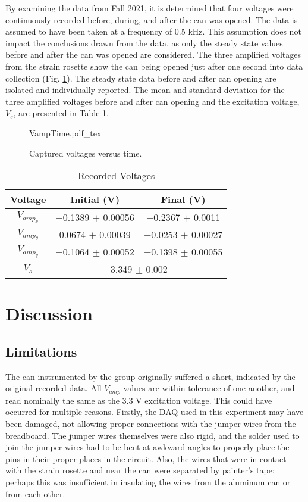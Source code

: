 \documentclass[10pt,journal,letterpaper]{IEEEtran}
\newcommand{\incfig}[1]{%
	\centering
    {#1.pdf_tex}
}
\begin{document}
By examining the data from Fall 2021, it is determined that four voltages were continuously recorded before, during, and after the can was opened.
The data is assumed to have been taken at a frequency of 0.5 kHz.
This assumption does not impact the conclusions drawn from the data, as only the steady state values before and after the can was opened are considered.
The three amplified voltages from the strain rosette show the can being opened just after one second into data collection (Fig. \ref{fig:VampTime}).
The steady state data before and after can opening are isolated and individually reported.
The mean and standard deviation for the three amplified voltages before and after can opening and the excitation voltage, $V_s$, are presented in Table \ref{tab:RecV}.
\begin{figure}[H]
\def\svgwidth{2.75in}
\incfig{VampTime}
\caption{Captured voltages versus time.}
\label{fig:VampTime}
\end{figure}

\begin{table}[H]
\renewcommand\arraystretch{1.25}
\centering
\caption{Recorded Voltages}
\begin{tabular}{ccc}
\hline \hline
Voltage & Initial (V) & Final (V) \\
\hline
$V_{amp_x}$ & $-$0.1389 $\pm$ 0.00056 & $-$0.2367 $\pm$ 0.0011 \\
$V_{amp_\theta}$ & 0.0674 $\pm$ 0.00039 & $-$0.0253 $\pm$ 0.00027 \\
$V_{amp_y}$ & $-$0.1064 $\pm$ 0.00052 & $-$0.1398 $\pm$ 0.00055 \\
$V_{s}$ & \multicolumn{2}{c}{3.349 $\pm$ 0.002} \\
\hline \hline
\end{tabular}
\label{tab:RecV}
\end{table}

\section{Discussion}

\subsection{Limitations}

The can instrumented by the group originally suffered a short, indicated by the original recorded data.
All $V_{amp}$ values are within tolerance of one another, and read nominally the same as the 3.3 V excitation voltage.
This could have occurred for multiple reasons.
Firstly, the DAQ used in this experiment may have been damaged, not allowing proper connections with the jumper wires from the breadboard.
The jumper wires themselves were also rigid, and the solder used to join the jumper wires had to be bent at awkward angles to properly place the pins in their proper places in the circuit.
Also, the wires that were in contact with the strain rosette and near the can were separated by painter's tape; perhaps this was insufficient in insulating the wires from the aluminum can or from each other.
\end{document}
